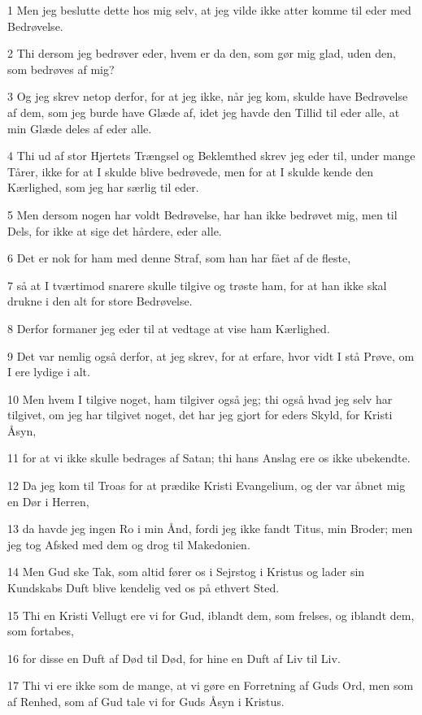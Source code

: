 \par 1 Men jeg beslutte dette hos mig selv, at jeg vilde ikke atter komme til eder med Bedrøvelse.
\par 2 Thi dersom jeg bedrøver eder, hvem er da den, som gør mig glad, uden den, som bedrøves af mig?
\par 3 Og jeg skrev netop derfor, for at jeg ikke, når jeg kom, skulde have Bedrøvelse af dem, som jeg burde have Glæde af, idet jeg havde den Tillid til eder alle, at min Glæde deles af eder alle.
\par 4 Thi ud af stor Hjertets Trængsel og Beklemthed skrev jeg eder til, under mange Tårer, ikke for at I skulde blive bedrøvede, men for at I skulde kende den Kærlighed, som jeg har særlig til eder.
\par 5 Men dersom nogen har voldt Bedrøvelse, har han ikke bedrøvet mig, men til Dels, for ikke at sige det hårdere, eder alle.
\par 6 Det er nok for ham med denne Straf, som han har fået af de fleste,
\par 7 så at I tværtimod snarere skulle tilgive og trøste ham, for at han ikke skal drukne i den alt for store Bedrøvelse.
\par 8 Derfor formaner jeg eder til at vedtage at vise ham Kærlighed.
\par 9 Det var nemlig også derfor, at jeg skrev, for at erfare, hvor vidt I stå Prøve, om I ere lydige i alt.
\par 10 Men hvem I tilgive noget, ham tilgiver også jeg; thi også hvad jeg selv har tilgivet, om jeg har tilgivet noget, det har jeg gjort for eders Skyld, for Kristi Åsyn,
\par 11 for at vi ikke skulle bedrages af Satan; thi hans Anslag ere os ikke ubekendte.
\par 12 Da jeg kom til Troas for at prædike Kristi Evangelium, og der var åbnet mig en Dør i Herren,
\par 13 da havde jeg ingen Ro i min Ånd, fordi jeg ikke fandt Titus, min Broder; men jeg tog Afsked med dem og drog til Makedonien.
\par 14 Men Gud ske Tak, som altid fører os i Sejrstog i Kristus og lader sin Kundskabs Duft blive kendelig ved os på ethvert Sted.
\par 15 Thi en Kristi Vellugt ere vi for Gud, iblandt dem, som frelses, og iblandt dem, som fortabes,
\par 16 for disse en Duft af Død til Død, for hine en Duft af Liv til Liv.
\par 17 Thi vi ere ikke som de mange, at vi gøre en Forretning af Guds Ord, men som af Renhed, som af Gud tale vi for Guds Åsyn i Kristus.

